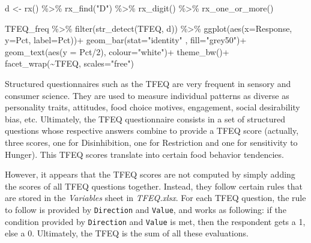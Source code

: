 \documentclass[
]{book}
\newenvironment{Shaded}{\begin{snugshade}}{\end{snugshade}}
\newcommand{\AttributeTok}[1]{\textcolor[rgb]{0.77,0.63,0.00}{#1}}
\newcommand{\DecValTok}[1]{\textcolor[rgb]{0.00,0.00,0.81}{#1}}
\newcommand{\FunctionTok}[1]{\textcolor[rgb]{0.00,0.00,0.00}{#1}}
\newcommand{\NormalTok}[1]{#1}
\newcommand{\OtherTok}[1]{\textcolor[rgb]{0.56,0.35,0.01}{#1}}
\newcommand{\SpecialCharTok}[1]{\textcolor[rgb]{0.00,0.00,0.00}{#1}}
\newcommand{\StringTok}[1]{\textcolor[rgb]{0.31,0.60,0.02}{#1}}
\begin{document}
\begin{Shaded}
\begin{Highlighting}[]
\NormalTok{d }\OtherTok{\textless{}{-}} \FunctionTok{rx}\NormalTok{() }\SpecialCharTok{\%\textgreater{}\%} 
  \FunctionTok{rx\_find}\NormalTok{(}\StringTok{"D"}\NormalTok{) }\SpecialCharTok{\%\textgreater{}\%} 
  \FunctionTok{rx\_digit}\NormalTok{() }\SpecialCharTok{\%\textgreater{}\%} 
  \FunctionTok{rx\_one\_or\_more}\NormalTok{()}

\NormalTok{TFEQ\_freq }\SpecialCharTok{\%\textgreater{}\%} 
  \FunctionTok{filter}\NormalTok{(}\FunctionTok{str\_detect}\NormalTok{(TFEQ, d)) }\SpecialCharTok{\%\textgreater{}\%} 
  \FunctionTok{ggplot}\NormalTok{(}\FunctionTok{aes}\NormalTok{(}\AttributeTok{x=}\NormalTok{Response, }\AttributeTok{y=}\NormalTok{Pct, }\AttributeTok{label=}\NormalTok{Pct))}\SpecialCharTok{+}
  \FunctionTok{geom\_bar}\NormalTok{(}\AttributeTok{stat=}\StringTok{"identity"}\NormalTok{ , }\AttributeTok{fill=}\StringTok{"grey50"}\NormalTok{)}\SpecialCharTok{+}
  \FunctionTok{geom\_text}\NormalTok{(}\FunctionTok{aes}\NormalTok{(}\AttributeTok{y =}\NormalTok{ Pct}\SpecialCharTok{/}\DecValTok{2}\NormalTok{), }\AttributeTok{colour=}\StringTok{"white"}\NormalTok{)}\SpecialCharTok{+}
  \FunctionTok{theme\_bw}\NormalTok{()}\SpecialCharTok{+}
  \FunctionTok{facet\_wrap}\NormalTok{(}\SpecialCharTok{\textasciitilde{}}\NormalTok{TFEQ, }\AttributeTok{scales=}\StringTok{"free"}\NormalTok{)}
\end{Highlighting}
\end{Shaded}

Structured questionnaires such as the TFEQ are very frequent in sensory and consumer science. They are used to measure individual patterns as diverse as personality traits, attitudes, food choice motives, engagement, social desirability bias, etc. Ultimately, the TFEQ questionnaire consists in a set of structured questions whose respective answers combine to provide a TFEQ score (actually, three scores, one for Disinhibition, one for Restriction and one for sensitivity to Hunger). This TFEQ scores translate into certain food behavior tendencies.

However, it appears that the TFEQ scores are not computed by simply adding the scores of all TFEQ questions together. Instead, they follow certain rules that are stored in the \emph{Variables} sheet in \emph{TFEQ.xlsx}. For each TFEQ question, the rule to follow is provided by \texttt{Direction} and \texttt{Value}, and works as following: if the condition provided by \texttt{Direction} and \texttt{Value} is met, then the respondent gets a 1, else a 0. Ultimately, the TFEQ is the sum of all these evaluations.
\end{document}
